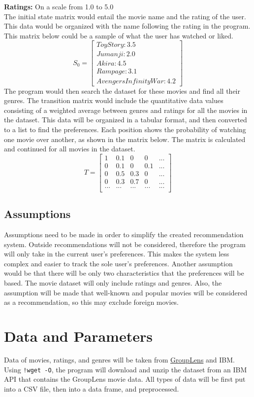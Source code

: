 \documentclass{article}
\begin{document}
\textbf{Ratings:} On a scale from 1.0 to 5.0\\

The initial state matrix would entail the movie name and the rating of the user. This data would be organized with the name following 
the rating in the program. This matrix below could be a sample
of what the user has watched or liked.
$$
S_0 =
\begin{bmatrix}
Toy Story:3.5 \\
Jumanji:2.0 \\
Akira:4.5 \\
Rampage:3.1 \\
Avengers Infinity War: 4.2
\end{bmatrix}
$$
    The program would then search the dataset for these movies and find all their genres. The transition matrix would include the 
quantitative data values consisting of a weighted average between genres and ratings for all the movies in the dataset. This data will be 
organized in a tabular format, and then converted to a list to find the preferences. Each position shows the probability of watching one 
movie over another, as shown in the matrix below. The matrix is calculated and continued for all movies in the dataset.
$$
T =
\begin{bmatrix}
1 & 0.1 & 0 & 0 & ...\\
0 & 0.1 & 0 & 0.1 & ...\\
0 & 0.5 & 0.3 & 0 & ...\\
0 & 0.3 & 0.7 & 0 & ...\\
... & ... & ... & ... & ...\\
\end{bmatrix}
$$ 

\subsection{Assumptions}
Assumptions need to be made in order to simplify the created recommendation system. Outside recommendations will not be considered, therefore the program will only take in 
the current user's preferences. This makes the system less complex and easier to track the sole user's preferences. 
Another assumption would be that there will be only two characteristics that the preferences will be based. The movie dataset will only include ratings and 
genres. Also, the assumption will be made that well-known and popular movies will be considered as a recommendation, so this may exclude foreign movies.


\section{Data and Parameters}
Data of movies, ratings, and genres will be taken from \href{http://grouplens.org/datasets/movielens/}{GroupLens} and IBM.  Using \verb|!wget -O|, the program will 
download and unzip the dataset from an IBM API that contains the GroupLens movie data. All types of data will be 
first put into a CSV file, then into a data frame, and preprocessed.\\
\end{document}
